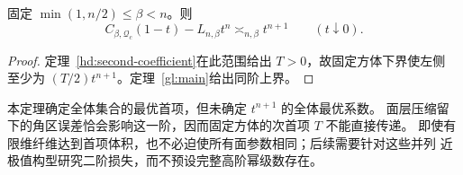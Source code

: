 \begin{corollary}\label{gl:positive-remainder}
固定 $\min(1,n/2)\le\beta<n$。则
\[
 C_{\beta,\mathcal Q_c}(1-t)-L_{n,\beta}t^n\asymp_{n,\beta}t^{n+1}
 \qquad(t\downarrow0).
\]
\end{corollary}
\begin{proof}
定理~\ref{hd:second-coefficient}在此范围给出 $T>0$，故固定方体下界使左侧
至少为 $(T/2)t^{n+1}$。定理~\ref{gl:main}给出同阶上界。
\end{proof}

\begin{remark}[首项之后的问题]\label{gl:next-order}
本定理确定全体集合的最优首项，但未确定 $t^{n+1}$ 的全体最优系数。
面层压缩留下的角区误差恰会影响这一阶，因而固定方体的次首项 $T$ 不能直接传递。
即使有限维纤维达到首项体积，也不必迫使所有面参数相同；后续需要针对这些并列
近极值构型研究二阶损失，而不预设完整高阶幂级数存在。
\end{remark}
